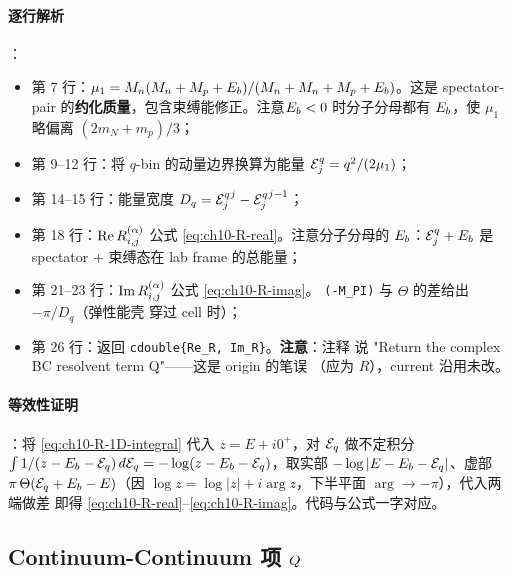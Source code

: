 \paragraph{逐行解析}：
\begin{itemize}
  \item 第 7 行：\(\mu_1 = M_n (M_n+M_p+E_b) / (M_n + M_n + M_p + E_b)\)。这是
        spectator-pair 的\textbf{约化质量}，包含束缚能修正。注意\(E_b < 0\)
        时分子分母都有 \(E_b\)，使 \(\mu_1\) 略偏离 \((2 m_N + m_p)/3\)；
  \item 第 9--12 行：将 \(q\)-bin 的动量边界换算为能量
        \({\mathcal{E}_{j}^{q}} = q^2/(2\mu_1)\)；
  \item 第 14--15 行：能量宽度 \(D_q = {\mathcal{E}_{j}^{q}}^{j} - {\mathcal{E}_{j}^{q}}^{j-1}\)；
  \item 第 18 行：\(\operatorname{Re} R_{i,j}^{(\alpha)}\) 公式 \cref{eq:ch10-R-real}。注意分子分母的
        \(E_b\)：\({\mathcal{E}_{j}^{q}} + E_b\) 是 spectator + 束缚态在 lab frame
        的总能量；
  \item 第 21--23 行：\(\operatorname{Im} R_{i,j}^{(\alpha)}\) 公式 \cref{eq:ch10-R-imag}。
        \texttt{(-M\_PI)} 与 \(\Theta\) 的差给出 \(-\pi/D_q\)（弹性能壳
        穿过 cell 时）；
  \item 第 26 行：返回 \texttt{cdouble\{Re\_R, Im\_R\}}。\textbf{注意}：注释
        说 "Return the complex BC resolvent term Q"——这是 origin 的笔误
        （应为 \(R\)），current 沿用未改。
\end{itemize}

\paragraph{等效性证明}：将 \cref{eq:ch10-R-1D-integral} 代入
\(z = E + i 0^{+}\)，对 \(\mathcal{E}_q\) 做不定积分 \(\int 1/(z - E_b -
\mathcal{E}_q)\, d\mathcal{E}_q = -\log(z - E_b - \mathcal{E}_q)\)，取实部 \(-\log|E -
E_b - \mathcal{E}_q|\)、虚部 \(\pi\,\Theta(\mathcal{E}_q + E_b - E)\)（因
\(\log z = \log|z| + i\arg z\)，下半平面 \(\arg \to -\pi\)），代入两端做差
即得 \cref{eq:ch10-R-real}--\cref{eq:ch10-R-imag}。代码与公式一字对应。

\subsection{Continuum-Continuum 项 \(Q\)}
\label{subsec:ch10-code-CC}



